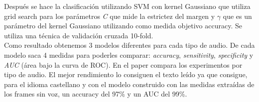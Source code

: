 \begin{itemize}
	Después se hace la clasificación utilizando SVM con kernel Gaussiano que utiliza grid search para los parámetros \textit{C} que mide la estrictez del margen y $\gamma$ que es un parámetro del kernel Gaussiano utilizando como medida objetivo accuracy. Se utiliza una técnica de validación cruzada 10-fold.\\ 
	Como resultado obtenemos 3 modelos diferentes para cada tipo de audio. De cada modelo saca 4 medidas para poderles comparar: \textit{accuracy}, \textit{sensitivity}, \textit{specificity} y \textit{AUC} (área bajo la curva de ROC). En el paper compara los experimentos por tipo de audio. El mejor rendimiento lo consiguen el texto leído ya que consigue, para el idioma castellano y con el modelo construido con las medidas extraídas de los frames sin voz, un accuracy del 97\% y un AUC del 99\%.
	

\end{itemize}

